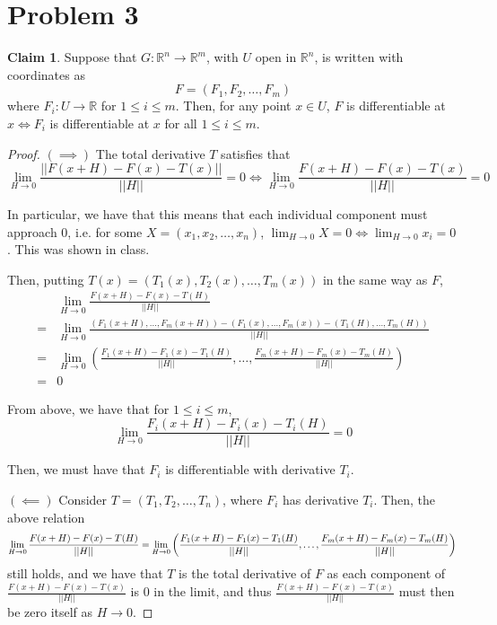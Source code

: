 \documentclass[12pt,letterpaper]{article}
\theoremstyle{definition}
\newtheorem*{claim}{Claim}
\newcommand{\R}{\mathbb{R}}
\begin{document}
\section*{Problem 3}

\begin{claim}
  Suppose that $G: \R^n \rightarrow \R^m$, with $U$ open in $\R^n$, is written
  with coordinates as
  \[
    F = (F_1, F_2, \dots, F_m)
  \]
  where $F_i:U \rightarrow \R$ for $1 \leq i \leq m$. Then, for any point $x \in
  U$, $F$ is differentiable at $x \iff F_i$ is differentiable at $x$ for all $1
  \leq i\leq m$. 
\end{claim}

\begin{proof}
  $(\implies)$
  The total derivative $T$ satisfies that
  \[
    \lim_{H\rightarrow 0}\frac{||F(x + H) - F(x) - T(x)||}{||H||} = 0 \iff \lim_{H\rightarrow 0}\frac{F(x + H) - F(x) - T(x)}{||H||} = 0
  \]

  In particular, we have that this means that each individual component must
  approach $0$, i.e. for some $X = (x_1, x_2, \dots, x_n)$, $\lim_{H\rightarrow
    0} X = 0 \iff \lim_{H\rightarrow 0}x_i = 0$. This was shown in class.

  Then, putting $T(x) = (T_1(x), T_2(x), \dots, T_m(x))$ in the same way as $F$,
  \begin{align*}
    &\lim_{H\rightarrow 0}\frac{F(x + H) - F(x) - T(H)}{||H||}\\
    = &\lim_{H\rightarrow 0}\frac{(F_1(x + H),\dots,F_m(x+H)) - (F_1(x),\dots,F_m(x)) - (T_1(H),\dots,T_m(H))}{||H||}  \\
    =&\lim_{H\rightarrow 0}\left( \frac{F_1(x+H)-F_1(x)-T_1(H)}{||H||}, \dots, \frac{F_m(x+H)-F_m(x)-T_m(H)}{||H||} \right) \\
    =& 0
  \end{align*}

  From above, we have that for $1 \leq i \leq m$,
  \[
    \lim_{H\rightarrow 0}\frac{F_i(x+H)-F_i(x)-T_i(H)}{||H||} = 0
  \]

  Then, we must have that $F_i$ is differentiable with derivative $T_i$.
  
  $(\impliedby)$ Consider $T = (T_1, T_2, \dots, T_n)$, where $F_i$ has
  derivative $T_i$. Then, the above relation
  \[
    \lim_{H\rightarrow 0}\frac{F(x + H) - F(x) - T(H)}{||H||} =
    \lim_{H\rightarrow 0}\left( \frac{F_1(x+H)-F_1(x)-T_1(H)}{||H||}, \dots, \frac{F_m(x+H)-F_m(x)-T_m(H)}{||H||} \right) \\
  \]
  still holds, and we have that $T$
  is the total derivative of $F$ as each component of $\frac{F(x + H) - F(x) -
    T(x)}{||H||}$ is 0 in the limit, and thus $\frac{F(x + H) - F(x) -
    T(x)}{||H||}$ must then be zero itself as $H \rightarrow 0$.
\end{proof}
\end{document}
